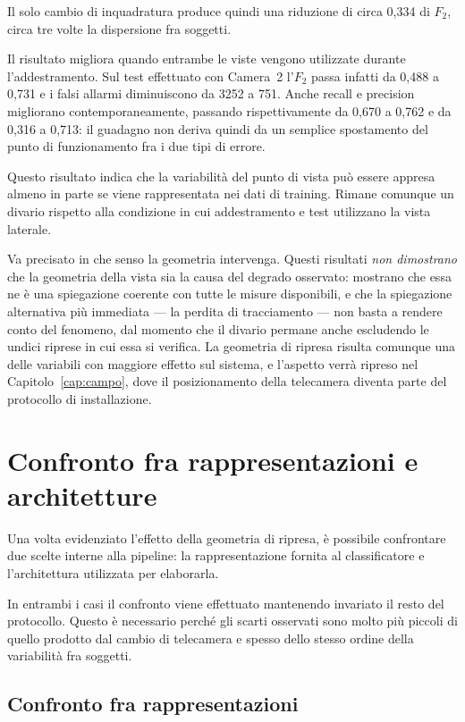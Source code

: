 Il solo cambio di inquadratura produce quindi una riduzione di circa 0,334 di $F_2$, circa tre volte la dispersione fra soggetti.

Il risultato migliora quando entrambe le viste vengono utilizzate durante l'addestramento. Sul test effettuato con Camera~2 l'$F_2$ passa infatti da 0,488 a 0,731 e i falsi allarmi diminuiscono da 3252 a 751. Anche recall e precision migliorano contemporaneamente, passando rispettivamente da 0,670 a 0,762 e da 0,316 a 0,713: il guadagno non deriva quindi da un semplice spostamento del punto di funzionamento fra i due tipi di errore.

Questo risultato indica che la variabilità del punto di vista può essere appresa almeno in parte se viene rappresentata nei dati di training. Rimane comunque un divario rispetto alla condizione in cui addestramento e test utilizzano la vista laterale.

Va precisato in che senso la geometria intervenga. Questi risultati \emph{non dimostrano} che la geometria della vista sia la causa del degrado osservato: mostrano che essa ne è una spiegazione coerente con tutte le misure disponibili, e che la spiegazione alternativa più immediata --- la perdita di tracciamento --- non basta a rendere conto del fenomeno, dal momento che il divario permane anche escludendo le undici riprese in cui essa si verifica. La geometria di ripresa risulta comunque una delle variabili con maggiore effetto sul sistema, e l'aspetto verrà ripreso nel Capitolo~\ref{cap:campo}, dove il posizionamento della telecamera diventa parte del protocollo di installazione.

\section{Confronto fra rappresentazioni e architetture}

Una volta evidenziato l'effetto della geometria di ripresa, è possibile confrontare due scelte interne alla pipeline: la rappresentazione fornita al classificatore e l'architettura utilizzata per elaborarla.

In entrambi i casi il confronto viene effettuato mantenendo invariato il resto del protocollo. Questo è necessario perché gli scarti osservati sono molto più piccoli di quello prodotto dal cambio di telecamera e spesso dello stesso ordine della variabilità fra soggetti.

\subsection{Confronto fra rappresentazioni}
\label{sec:featureset}

